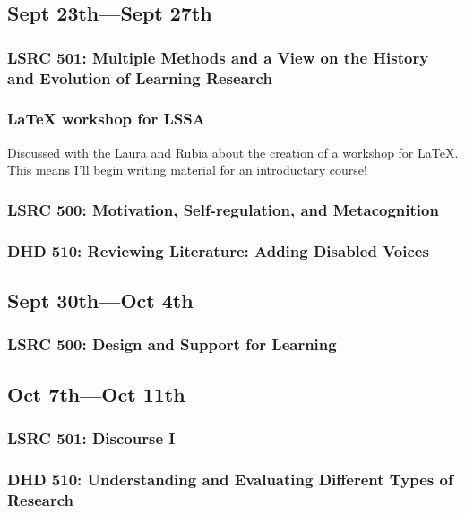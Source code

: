 \documentclass{TC}
\begin{document}
	
\subsection{Sept 23th---Sept 27th}
	\subsubsection{LSRC 501: Multiple Methods and a View on the History and Evolution of Learning Research}
	
	\subsubsection{\LaTeX\; workshop for \gls{LSSA}}
	Discussed with the Laura and Rubia about the creation of a workshop for \LaTeX. This means I'll begin writing material for an introductary course!
	
	\subsubsection{LSRC 500: Motivation, Self-regulation, and Metacognition}
	
	
	\subsubsection{DHD 510: Reviewing Literature: Adding Disabled Voices}
	
	
	
\subsection{Sept 30th---Oct 4th}
	\subsubsection{LSRC 500: Design and Support for Learning} 
	
	
\subsection{Oct 7th---Oct 11th}
	\subsubsection{LSRC 501: Discourse I}
	
	
	\subsubsection{DHD 510: Understanding and Evaluating Different Types of Research}
	
	
\end{document}
